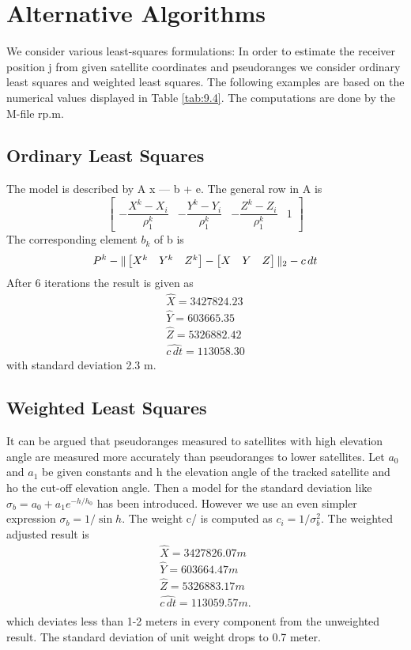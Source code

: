 \section{Alternative Algorithms}
	We consider various least-squares formulations: In order to estimate the receiver position j from given satellite coordinates and pseudoranges we consider ordinary least squares and weighted least squares. The following examples are based on the numerical values displayed in Table \ref{tab:9.4}. The computations are done by the M-file rp.m.
	\subsection{Ordinary Least Squares}
		The model is described by A x — b + e. The general row in A is
		\[ 
			\begin{bmatrix}
				-\dfrac{X^k-X_i}{\rho^k_1} & -\dfrac{Y^k-Y_i}{\rho^k_1} & -\dfrac{Z^k-Z_i}{\rho^k_1} & 1
			\end{bmatrix} 
		\]
		The corresponding element $b_k$ of b is
		\[
			P^k - \Arrowvert 
			\begin{bmatrix}
			X^k & Y^k & Z^k
			\end{bmatrix}-
			\begin{bmatrix}
			X & Y & Z
			\end{bmatrix}
			\Arrowvert_2
			-c\,dt
		\]
		After 6 iterations the result is given as
		\[
		\begin{split}
		\hat{X} = 3427824.23 \\
		\hat{Y} =  603665.35 \\
		\hat{Z} = 5326882.42 \\
		\hat{c\,dt} =  113058.30
		\end{split}
		\]
		with standard deviation 2.3 m.
	
	\subsection{Weighted Least Squares}
		It can be argued that pseudoranges measured to satellites with high elevation angle are measured more accurately than pseudoranges to lower satellites. Let $a_0$ and $a_1$ be given constants and h the elevation angle of the tracked satellite and ho the cut-off elevation angle. Then a model for the standard deviation like $\sigma_b = a_0 + a_1e^{-h/h_0}$ has been introduced. However we use an even simpler expression $\sigma_b=1/\sin h$. The weight c/ is computed as $c_i=1/\sigma^2_b$. The weighted adjusted result is
		\[
		\begin{split}
			\hat{X} = 3427826.07 m \\
			\hat{Y} =  603664.47 m \\
			\hat{Z} = 5326883.17 m \\
			\hat{c\,dt} = 113059.57 m. \\
		\end{split}
		\]
		which deviates less than 1-2 meters in every component from the unweighted result. The standard deviation of unit weight drops to 0.7 meter.
	
